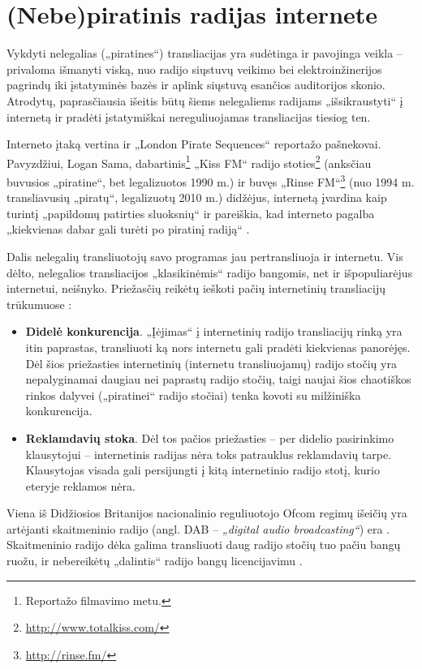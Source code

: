 \documentclass[kursinis-darbas]{vukf}
\begin{document}
\section{(Nebe)piratinis radijas internete}

Vykdyti nelegalias („piratines“) transliacijas yra sudėtinga ir pavojinga veikla – privaloma išmanyti viską, nuo radijo siųstuvų veikimo bei elektroinžinerijos pagrindų iki įstatyminės bazės ir aplink siųstuvą esančios auditorijos skonio. Atrodytų, paprasčiausia išeitis būtų šiems nelegaliems radijams „išsikraustyti“ į internetą ir pradėti įstatymiškai nereguliuojamas transliacijas tiesiog ten.

Interneto įtaką vertina ir „London Pirate Sequences“ reportažo pašnekovai. Pavyzdžiui, Logan Sama, dabartinis\footnote{Reportažo filmavimo metu.} „Kiss FM“ radijo stoties\footnote{\url{http://www.totalkiss.com/}} (anksčiau buvusios „piratine“, bet legalizuotos 1990 m.) ir buvęs „Rinse FM“\footnote{\url{http://rinse.fm/}} (nuo 1994 m. transliavusių „piratų“, legalizuotų 2010 m.) didžėjus, internetą įvardina kaip turintį „papildomų patirties sluoksnių“ ir pareiškia, kad interneto pagalba „kiekvienas dabar gali turėti po piratinį radiją“ \cite{vice_london_pirate_sequences}.

Dalis nelegalių transliuotojų savo programas jau pertransliuoja ir internetu. Vis dėlto, nelegalios transliacijos „klasikinėmis“ radijo bangomis, net ir išpopuliarėjus internetui, neišnyko. Priežasčių reikėtų ieškoti pačių internetinių transliacijų trūkumuose \cite[p.~758]{chs_encyclopedia_of_radio}:

\begin{itemize}
	\item \textbf{Didelė konkurencija}. „Įėjimas“ į internetinių radijo transliacijų rinką yra itin paprastas, transliuoti ką nors internetu gali pradėti kiekvienas panorėjęs. Dėl šios priežasties internetinių (internetu transliuojamų) radijo stočių yra nepalyginamai daugiau nei paprastų radijo stočių, taigi naujai šios chaotiškos rinkos dalyvei („piratinei“ radijo stočiai) tenka kovoti su milžiniška konkurencija.
	\item \textbf{Reklamdavių stoka}. Dėl tos pačios priežasties – per didelio pasirinkimo klausytojui – internetinis radijas nėra toks patrauklus reklamdavių tarpe. Klausytojas visada gali persijungti į kitą internetinio radijo stotį, kurio eteryje reklamos nėra.
\end{itemize}

Viena iš Didžiosios Britanijos nacionalinio reguliuotojo \gls{Ofcom} regimų išeičių yra artėjanti skaitmeninio radijo (angl. DAB – \emph{„digital audio broadcasting“}) era \cite{bbc_radio_4_do_pirates_rule_the_air_waves}. Skaitmeninio radijo dėka galima transliuoti daug radijo stočių tuo pačiu bangų ruožu, ir nebereikėtų „dalintis“ radijo bangų licencijavimu \cite{worlddab}.
\end{document}
